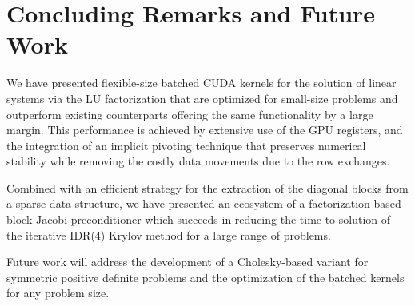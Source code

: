 \section{Concluding Remarks and Future Work}
\label{2017-lu-block-jacobi:sec:summary}

We have presented flexible-size batched CUDA kernels for the solution of linear systems via the LU 
factorization that are optimized for small-size problems
and outperform existing counterparts offering the same functionality by a large margin. 
This performance is achieved by extensive use of the GPU registers, and
the integration of an implicit pivoting technique that preserves numerical stability
while removing the costly data movements due to the row exchanges.

Combined with an efficient strategy for the extraction of the diagonal blocks from a sparse data structure,
we have presented an ecosystem of a factorization-based block-Jacobi preconditioner
which succeeds in reducing the time-to-solution of the iterative IDR(4) Krylov method for a large range of problems.

Future work will address the development of a Cholesky-based variant 
for symmetric positive definite problems and the optimization of the batched kernels for any problem size.

